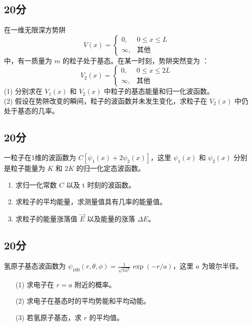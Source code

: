 \subsection{20分}
在一维无限深方势阱
\[
V(x) = 
\begin{cases}
0, & 0 \leq x \leq L \\
\infty, & \text{其他}
\end{cases}~
\]
中，有一质量为 $m$ 的粒子处于基态。在某一时刻，势阱突然变为 ：
\[
V_2(x) = 
\begin{cases}
0, & 0 \leq x \leq 2L \\
\infty, & \text{其他}
\end{cases}~
\]
(1) 分别求在 $V_1(x)$ 和 $V_2(x)$ 中粒子的基态能量和归一化波函数。\\
(2) 假设在势阱改变的瞬间，粒子的波函数并未发生变化，求粒子在 $V_2(x)$ 中仍处于基态的几率。
\subsection{20分}
一粒子在1维的波函数为 $C[\psi_1(x) + 2\psi_2(x)]$，这里 $\psi_1(x)$ 和 $\psi_2(x)$ 分别是粒子能量为 $K$ 和 $2K$ 的归一化定态波函数。
\begin{enumerate}
    \item 求归一化常数 $C$ 以及 t 时刻的波函数。
    \item 求粒子的平均能量，求测量值具有几率的能量值。
    \item 求粒子的能量涨落值 $ \vec E $ 以及能量的涨落 $\Delta E$。
\end{enumerate}
\subsection{20分}
氢原子基态波函数为 $\psi_{100}(r, \theta, \phi) = \frac{1}{\sqrt{\pi a^3}} \exp(-r/a)$，这里 $a$ 为玻尔半径。
\begin{enumerate}
    \item [(1)] 求电子在 $r = a$ 附近的概率。
    \item [(2)] 求电子在基态时的平均势能和平均动能。
    \item [(3)] 若氢原子基态，求 $r$ 的平均值。
\end{enumerate}